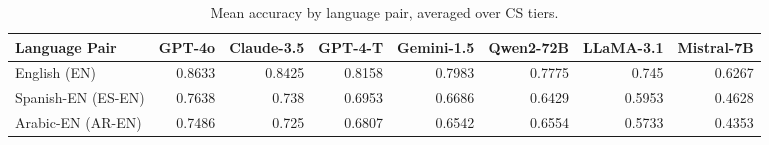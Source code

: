 \begin{table}[t]
\centering
\caption{Mean accuracy by language pair, averaged over CS tiers.}
\label{tab:langpair}
\begin{tabular}{lrrrrrrr}
\toprule
Language Pair & GPT-4o & Claude-3.5 & GPT-4-T & Gemini-1.5 & Qwen2-72B & LLaMA-3.1 & Mistral-7B \\
\midrule
English (EN) & 0.8633 & 0.8425 & 0.8158 & 0.7983 & 0.7775 & 0.745 & 0.6267 \\
Spanish-EN (ES-EN) & 0.7638 & 0.738 & 0.6953 & 0.6686 & 0.6429 & 0.5953 & 0.4628 \\
Arabic-EN (AR-EN) & 0.7486 & 0.725 & 0.6807 & 0.6542 & 0.6554 & 0.5733 & 0.4353 \\
\bottomrule
\end{tabular}
\end{table}